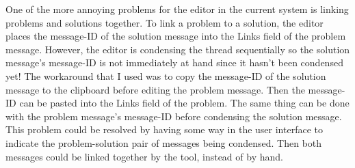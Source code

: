 One of the more annoying problems for the editor in the current system is
linking problems and solutions together. To link a problem to a solution, the
editor places the message-ID of the solution message into the Links field of
the problem message. However, the editor is condensing the thread sequentially
so the solution message's message-ID is not immediately at hand since it hasn't
been condensed yet! The workaround that I used was to copy the message-ID of
the solution message to the clipboard before editing the problem message.  Then
the message-ID can be pasted into the Links field of the problem. The same
thing can be done with the problem message's message-ID before condensing the
solution message. This problem could be resolved by having some way in the user
interface to indicate the problem-solution pair of messages being condensed.
Then both messages could be linked together by the tool, instead of by hand.

